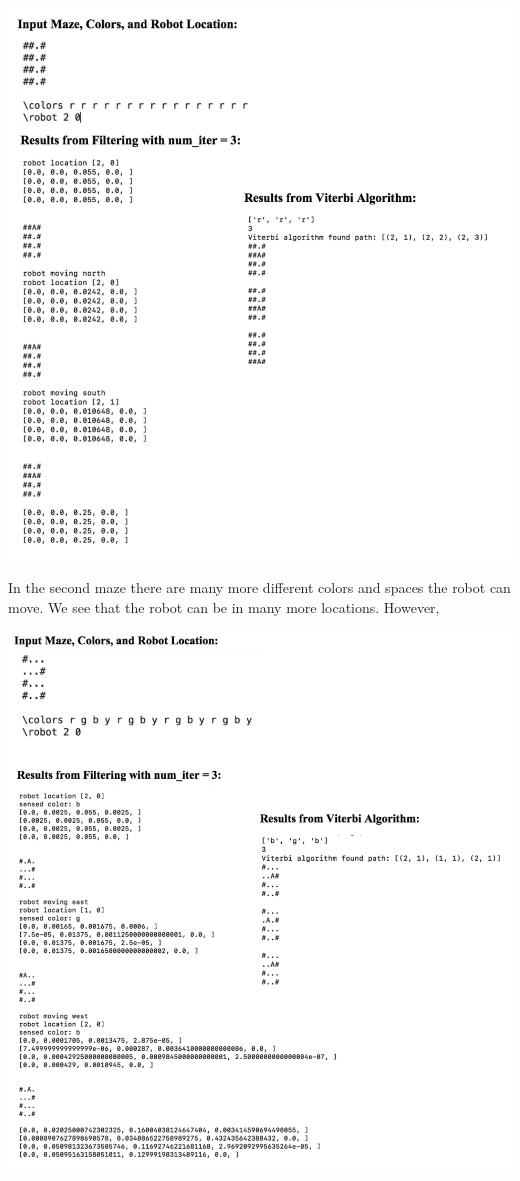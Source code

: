 \documentclass{article}
\begin{document}
\includegraphics[width=\textwidth]{test_image_maze1.pdf}

In the second maze there are many more different colors and spaces the robot can move. We see that the robot can be in many more locations. However, 

\includegraphics[width=\textwidth]{test_images_maze2.pdf}
\end{document}
